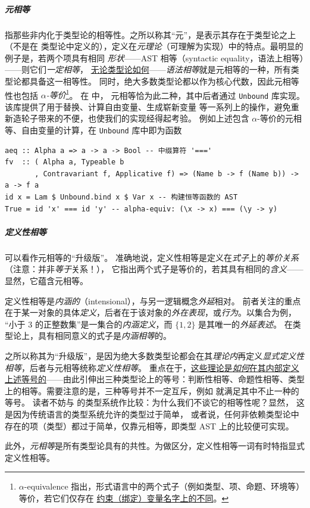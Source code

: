 \subparagraph{元相等}指那些非内化于类型论的相等性。之所以称其“元”，是表示其存在于类型论之上（不是在
类型论中定义的），定义在\emph{元理论}（可理解为实现）中的特点。最明显的例子是，若两个项具有相同
\emph{形状}——AST 相等（syntactic equality，语法上相等）——则它们\emph{一定相等}，
\underline{无论类型论如何}——\emph{语法相等}就是元相等的一种，所有类型论都具备这一相等性。
同时，绝大多数类型论都以\lambdacalc 作为核心代数，因此元相等性也包括 \emph{$\alpha$-等价}\footnote{
  $\alpha$-equivalence 指出，形式语言中的两个式子（例如类型、项、命题、环境等）等价，若它们仅存在
  \underline{约束（绑定）变量名字上的不同}。
}。
在 \Tigrisd 中，
元相等恰为此二种，其中后者通过 \texttt{Unbound} 库实现。该库提供了用于替换、计算自由变量、生成崭新变量
等一系列\lambdacalc 上的操作，避免重新造轮子带来的不便，也使我们的实现经得起考验。
例如上述包含 $\alpha$-等价的元相等、自由变量的计算，在 \texttt{Unbound} 库中即为函数
\begin{verbatim}
aeq :: Alpha a => a -> a -> Bool -- 中缀算符 '==='
fv  :: ( Alpha a, Typeable b
       , Contravariant f, Applicative f) => (Name b -> f (Name b)) -> a -> f a
id x = Lam $ Unbound.bind x $ Var x -- 构建恒等函数的 AST
True = id 'x' === id 'y' -- alpha-equiv: (\x -> x) === (\y -> y)
\end{verbatim}
\subparagraph{定义性相等}可以看作元相等的“升级版”。
准确地说，定义性相等是定义在\emph{式子}上的\emph{等价关系}（注意：并非\emph{等于}关系！），
它指出两个式子是等价的，若其具有相同的\emph{含义}——显然，它蕴含元相等。

定义性相等是\emph{内涵的}（intensional），与另一逻辑概念\emph{外延}相对。
前者关注的重点在于某一对象的具体\emph{定义}，后者在于该对象的\emph{外在表现}，或\emph{行为}。以集合为例，
“小于 3 的正整数集”是一集合的\emph{内涵定义}，而 $\{1,2\}$ 是其唯一的\emph{外延表述}。
在类型论上，具有相同意义的式子是\emph{内涵相等}的。

之所以称其为“升级版”，是因为绝大多数类型论都会在其\emph{理论内}再定义\emph{显式定义性相等}，后者与元相等统称\emph{定义性相等}。
重点在于，\underline{这些理论是\emph{如何}在其内部定义上述等号的}——由此引伸出三种类型论上的等号：判断性相等、命题性相等、类型上的相等。需要注意的是，三种等号并不一定互斥，例如 \Tigrisd 就满足其中不止一种的等号。
读者不妨与 \Tigris 的类型系统作比较：为什么我们不谈它的相等性呢？显然，
这是因为传统语言的类型系统允许的类型过于简单，
或者说，任何非依赖类型论中存在的项（类型）都过于简单，仅靠元相等，即类型 AST 上的比较便可实现。

此外，\emph{元相等}是所有类型论具有的共性。为做区分，定义性相等一词有时特指显式定义性相等。

